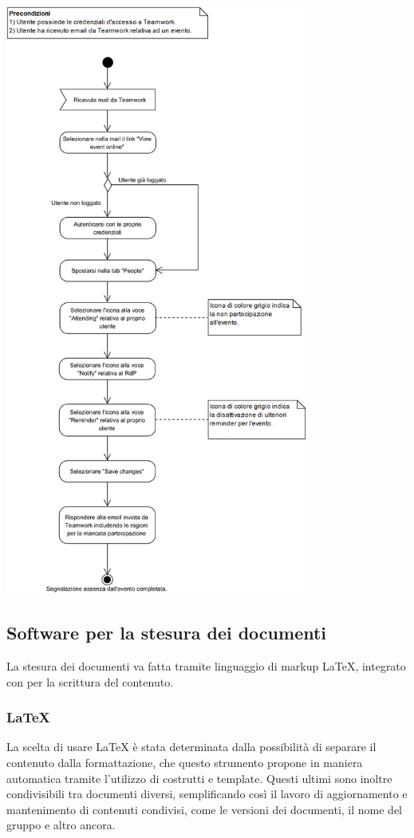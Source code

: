 \begin{center}
	\includegraphics[width=10cm]{./DiagrammiProcedure/SegnalazioneAssenzaDaUnEvento.png}
\end{center}

\subsection{Software per la stesura dei documenti}
La stesura dei documenti va fatta tramite linguaggio di markup \LaTeX{}, integrato con  per la scrittura del contenuto. 

\subsubsection{\LaTeX}
La scelta di usare \LaTeX{} è stata determinata dalla possibilità di separare il contenuto dalla formattazione, che questo strumento propone in maniera automatica tramite l'utilizzo di costrutti e template. Questi ultimi sono inoltre condivisibili tra documenti diversi, semplificando così il lavoro di aggiornamento e mantenimento di contenuti condivisi, come le versioni dei documenti, il nome del gruppo e altro ancora.

